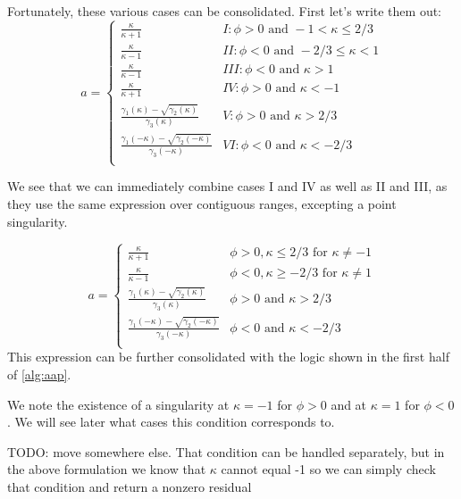 Fortunately, these various cases can be consolidated.  First let's write them out:
\begin{equation}
    a =
    \begin{cases}
        \frac{\kappa}{\kappa + 1} & I: \phi > 0 \text{ and } -1 < \kappa \le 2/3 \\
        \frac{\kappa}{\kappa - 1} & II: \phi < 0 \text{ and } -2/3 \le \kappa < 1 \\
        \frac{\kappa}{\kappa - 1} & III: \phi < 0 \text{ and } \kappa > 1 \\
        \frac{\kappa}{\kappa + 1} & IV: \phi > 0 \text{ and } \kappa < -1 \\
        \frac{\gamma_1(\kappa) - \sqrt{\gamma_2(\kappa)}}{\gamma_3(\kappa)} & V: \phi > 0 \text{ and } \kappa > 2/3 \\
        \frac{\gamma_1(-\kappa) - \sqrt{\gamma_2(-\kappa)}}{\gamma_3(-\kappa)} & VI: \phi < 0 \text{ and } \kappa < -2/3 \\
    \end{cases}
\end{equation}

We see that we can immediately combine cases I and IV as well as II and III, as they use the same expression over contiguous ranges, excepting a point singularity.

\begin{equation}
    a =
    \begin{cases}
        \frac{\kappa}{\kappa + 1} & \phi > 0, \kappa \le 2/3 \text{ for } \kappa \ne -1\\
        \frac{\kappa}{\kappa - 1} & \phi < 0, \kappa \ge -2/3 \text{ for } \kappa \ne 1\\
        \frac{\gamma_1(\kappa) - \sqrt{\gamma_2(\kappa)}}{\gamma_3(\kappa)} & \phi > 0 \text{ and } \kappa > 2/3 \\
        \frac{\gamma_1(-\kappa) - \sqrt{\gamma_2(-\kappa)}}{\gamma_3(-\kappa)} & \phi < 0 \text{ and } \kappa < -2/3 \\
    \end{cases}
    \label{eq:asing}
\end{equation}
This expression can be further consolidated with the logic shown in the first half of \cref{alg:aap}.


We note the existence of a singularity at $\kappa = -1$ for $\phi > 0$ and at $\kappa = 1$ for $\phi < 0$.  We will see later what cases this condition corresponds to.

TODO: move somewhere else.  That condition can be handled separately, but in the above formulation we know that $\kappa$ cannot equal -1 so we can simply check that condition and return a nonzero residual


